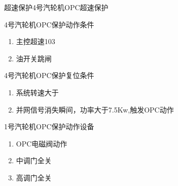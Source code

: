 \documentclass[12pt,hyperref={CJKbookmarks=true}]{beamer} %
\begin{document}
\begin{frame}{超速保护}{4号汽轮机OPC超速保护}
\begin{block}{\heiti 4号汽轮机OPC保护动作条件}
			\begin{enumerate}
				\item 主控超速103
				\item 油开关跳闸
		\end{enumerate}
		\end{block}
\begin{block}{\heiti 4号汽轮机OPC保护复位条件}
			\begin{enumerate}
				\item 系统转速大于
				\item 并网信号消失瞬间，功率大于7.5Kw,触发OPC动作
		\end{enumerate}
		\end{block}
\begin{block}{\heiti 1号汽轮机OPC保护动作设备}
			\begin{enumerate}
				\item OPC电磁阀动作
				\item 中调门全关
				\item 高调门全关
		\end{enumerate}
		\end{block}
\end{frame}
\end{document}
